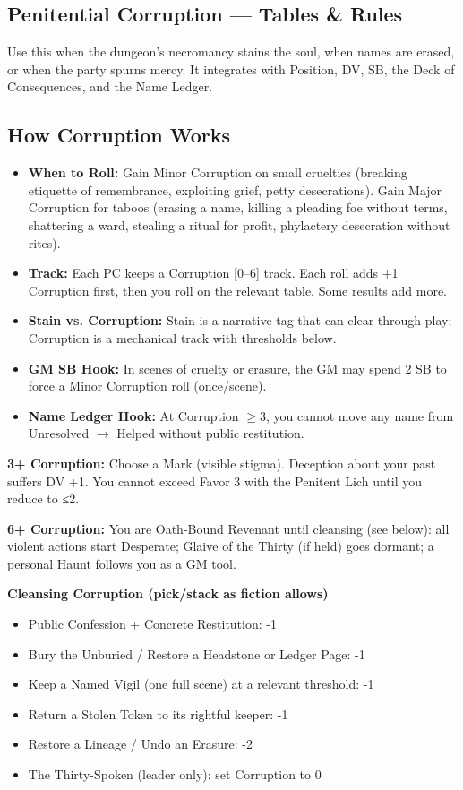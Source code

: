 \documentclass[18pt, letterpaper, twoside]{article}
\newcommand{\corruptiontitle}[1]{\subsection*{#1}}
\newcommand{\threshold}[2]{\noindent\textbf{#1+ Corruption:} #2\par}
\begin{document}
\begin{enumerate}
\section{Penitential Corruption --- Tables \& Rules}

Use this when the dungeon's necromancy stains the soul, when names are erased, or when the party spurns mercy. It integrates with Position, DV, SB, the Deck of Consequences, and the Name Ledger.

\corruptiontitle{How Corruption Works}
\begin{itemize}
    \item \textbf{When to Roll:} Gain Minor Corruption on small cruelties (breaking etiquette of remembrance, exploiting grief, petty desecrations). Gain Major Corruption for taboos (erasing a name, killing a pleading foe without terms, shattering a ward, stealing a ritual for profit, phylactery desecration without rites).
    \item \textbf{Track:} Each PC keeps a Corruption [0--6] track. Each roll adds +1 Corruption first, then you roll on the relevant table. Some results add more.
    \item \textbf{Stain vs. Corruption:} Stain is a narrative tag that can clear through play; Corruption is a mechanical track with thresholds below.
    \item \textbf{GM SB Hook:} In scenes of cruelty or erasure, the GM may spend 2 SB to force a Minor Corruption roll (once/scene).
    \item \textbf{Name Ledger Hook:} At Corruption $\geq$3, you cannot move any name from Unresolved $\rightarrow$ Helped without public restitution.
\end{itemize}

\threshold{3}{Choose a Mark (visible stigma). Deception about your past suffers DV +1. You cannot exceed Favor 3 with the Penitent Lich until you reduce to ≤2.}
\threshold{6}{You are Oath-Bound Revenant until cleansing (see below): all violent actions start Desperate; Glaive of the Thirty (if held) goes dormant; a personal Haunt follows you as a GM tool.}

\textbf{Cleansing Corruption (pick/stack as fiction allows)}
\begin{itemize}
    \item Public Confession + Concrete Restitution: -1
    \item Bury the Unburied / Restore a Headstone or Ledger Page: -1
    \item Keep a Named Vigil (one full scene) at a relevant threshold: -1
    \item Return a Stolen Token to its rightful keeper: -1
    \item Restore a Lineage / Undo an Erasure: -2
    \item The Thirty-Spoken (leader only): set Corruption to 0
\end{itemize}


\end{enumerate}
\end{document}
